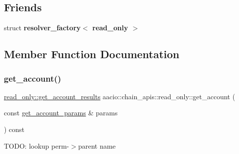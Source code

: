 \subsection*{Friends}
\begin{DoxyCompactItemize}
\item 
\mbox{\label{classaacio_1_1chain__apis_1_1read__only_a7ad3823d01d4e6491c314c824a73b3d2}} 
struct {\bfseries resolver\+\_\+factory$<$ read\+\_\+only $>$}
\end{DoxyCompactItemize}


\subsection{Member Function Documentation}
\mbox{\label{classaacio_1_1chain__apis_1_1read__only_a73489f54a3810e8cf7ba7545674d023a}} 
\subsubsection{\texorpdfstring{get\+\_\+account()}{get\_account()}}
{\footnotesize\ttfamily \mbox{\hyperlink{structaacio_1_1chain__apis_1_1read__only_1_1get__account__results}{read\+\_\+only\+::get\+\_\+account\+\_\+results}} aacio\+::chain\+\_\+apis\+::read\+\_\+only\+::get\+\_\+account (\begin{DoxyParamCaption}\item[{const \mbox{\hyperlink{structaacio_1_1chain__apis_1_1read__only_1_1get__account__params}{get\+\_\+account\+\_\+params}} \&}]{params }\end{DoxyParamCaption}) const}

T\+O\+DO\+: lookup perm-\/$>$parent name \mbox{\label{classaacio_1_1chain__apis_1_1read__only_ae87764c63b35b8891805dcb93d6ce8cd}} 
